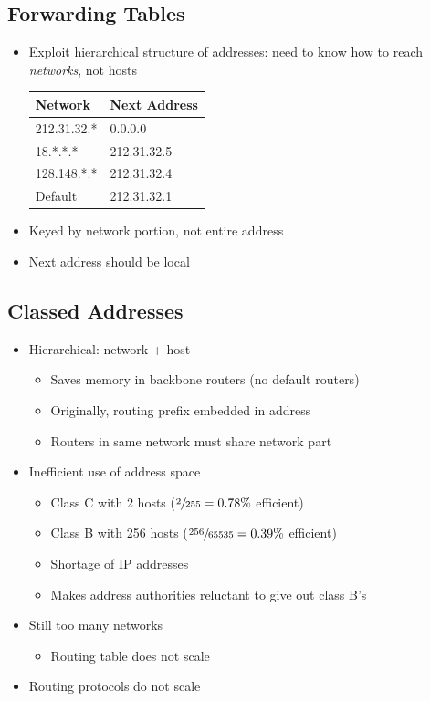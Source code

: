 \subsection{Forwarding Tables}
\begin{itemize}[nosep]
    \item Exploit hierarchical structure of addresses: need to know how to reach \emph{networks}, not hosts
          \begin{table}[H]
              \begin{tabular}{l l}
                  Network     & Next Address \\\toprule
                  212.31.32.* & 0.0.0.0      \\
                  18.*.*.*    & 212.31.32.5  \\
                  128.148.*.* & 212.31.32.4  \\
                  Default     & 212.31.32.1  \\\bottomrule
              \end{tabular}
          \end{table}
    \item Keyed by network portion, not entire address
    \item Next address should be local
\end{itemize}

\subsection{Classed Addresses}
\begin{itemize}[nosep]
    \item Hierarchical: network + host
          \begin{itemize}[nosep]
              \item Saves memory in backbone routers (no default routers)
              \item Originally, routing prefix embedded in address
              \item Routers in same network must share network part
          \end{itemize}
    \item Inefficient use of address space
          \begin{itemize}[nosep]
              \item Class C with 2 hosts ($\sfrac{2}{255} = 0.78\%$ efficient)
              \item Class B with 256 hosts ($\sfrac{256}{65535} = 0.39\%$ efficient)
              \item Shortage of IP addresses
              \item Makes address authorities reluctant to give out class B's
          \end{itemize}
    \item Still too many networks
          \begin{itemize}[nosep]
              \item Routing table does not scale
          \end{itemize}
    \item Routing protocols do not scale
\end{itemize}

